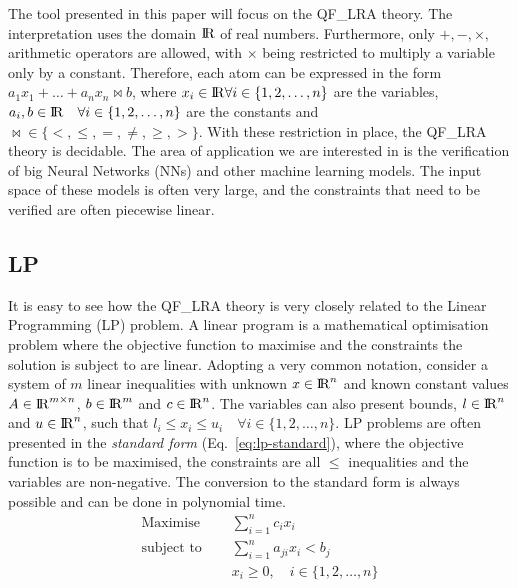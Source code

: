 \documentclass[runningheads]{llncs}
\begin{document}
The tool presented in this paper will focus on the QF\_LRA theory.
The interpretation uses the domain ${\rm I\!R}$ of real numbers.
Furthermore, only $+, -, \times,$ arithmetic operators are allowed, with $\times$ being restricted to multiply a variable only by a constant.
Therefore, each atom can be expressed in the form $a_1x_1 + \ldots + a_nx_n \bowtie b$, where $x_i \in {\rm I\!R} \forall i \in \{1, 2, \dots, n\}$ are the variables, $a_i, b \in {\rm I\!R} \quad \forall i \in \{1, 2, \dots, n\}$ are the constants and $\bowtie \in \{<, \le, =, \ne, \ge, >\}$.
With these restriction in place, the QF\_LRA theory is decidable.
The area of application we are interested in is the verification of big Neural Networks (NNs) and other machine learning models.
The input space of these models is often very large, and the constraints that need to be verified are often piecewise linear.

\subsection{LP}
\label{sec:lp}

It is easy to see how the QF\_LRA theory is very closely related to the Linear Programming (LP) problem.
A linear program is a mathematical optimisation problem where the objective function to maximise and the constraints the solution is subject to are linear.
Adopting a very common notation, consider a system of $m$ linear inequalities with unknown $x \in {\rm I\!R}^n$ and known constant values $A \in {\rm I\!R}^{m \times n}$, $b \in {\rm I\!R}^m$ and $c \in {\rm I\!R}^n$.
The variables can also present bounds, $l \in {\rm I\!R}^n$ and $u \in {\rm I\!R}^n$, such that $l_i \le x_i \le u_i \quad \forall i \in \{1, 2, \ldots, n\}$.
LP problems are often presented in the \textit{standard form} (Eq.~\ref{eq:lp-standard}), where the objective function is to be maximised, the constraints are all $\le$ inequalities and the variables are non-negative.
The conversion to the standard form is always possible and can be done in polynomial time.
\begin{equation}
    \label{eq:lp-standard}
    \begin{split}
        \text{Maximise }   \quad & \sum_{i=1}^{n} c_i x_i                      \\
        \text{subject to } \quad & \sum_{i=1}^{n} a_{ji}x_{i} < b_j            \\
                                 & x_i \ge 0,  \quad i \in \{1, 2, \ldots, n\}
    \end{split}
\end{equation}
\end{document}
